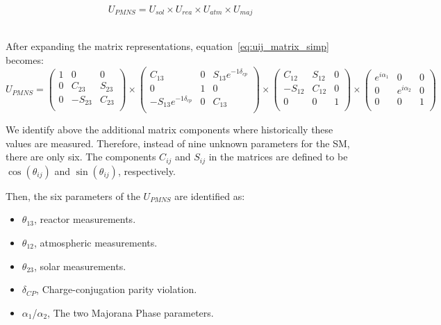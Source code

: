 \begin{equation}
U_{PMNS}
=
U_{sol} \times U_{rea} \times U_{atm} \times U_{maj}
\end{equation}
~\label{eq:uij_matrix_simp}

After expanding the matrix representations, equation~\ref{eq:uij_matrix_simp} becomes:
\begin{equation}
U_{PMNS}
=
\begin{pmatrix}
1 & 0 & 0 \\
0 & C_{23} & S_{23} \\
0 & -S_{23} & C_{23} \\
\end{pmatrix}
\times
\begin{pmatrix}
C_{13} & 0 & S_{13}e^{-1\delta_{cp}} \\
0 & 1 & 0 \\
-S_{13}e^{-1\delta_{cp}} & 0 & C_{13} \\
\end{pmatrix}
\times
\begin{pmatrix}
C_{12} & S_{12} & 0 \\
-S_{12} & C_{12} & 0 \\
0 & 0 & 1 \\
\end{pmatrix}
\times
\begin{pmatrix}
e^{i\alpha_{1}} & 0 & 0 \\
0 & e^{i\alpha_{2}} & 0 \\
0 & 0 & 1 \\
\end{pmatrix}
\end{equation}

We identify above the additional matrix components where historically these values are measured.
Therefore, instead of nine unknown parameters for the SM, there are only six.
The components $C_{ij}$ and $S_{ij}$ in the matrices are defined to be $\cos(\theta_{ij})$ and $\sin(\theta_{ij})$, respectively.

Then, the six parameters of the $U_{PMNS}$ are identified as:

\begin{itemize}
    \item $\theta_{13}$, reactor measurements.
    \item $\theta_{12}$, atmospheric measurements.
    \item $\theta_{23}$, solar measurements.
    \item $\delta_{CP}$, Charge-conjugation parity violation.
    \item $\alpha_{1}$/$\alpha_{2}$, The two Majorana Phase parameters.
\end{itemize}

